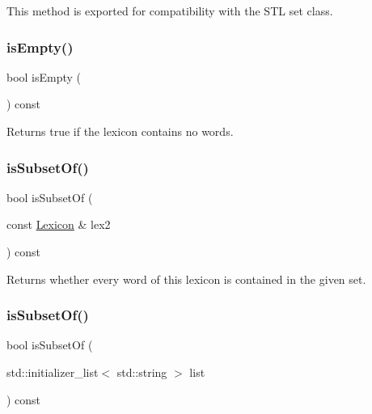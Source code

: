 This method is exported for compatibility with the S\+TL {\ttfamily set} class. \mbox{\label{classLexicon_acf82f9b2937375c7b1cf3dccb3df3312}} 
\subsubsection{\texorpdfstring{is\+Empty()}{isEmpty()}}
{\footnotesize\ttfamily bool is\+Empty (\begin{DoxyParamCaption}{ }\end{DoxyParamCaption}) const}



Returns {\ttfamily true} if the lexicon contains no words. 

\mbox{\label{classLexicon_a6c118f41dad8941a624c3ff479987e3d}} 
\subsubsection{\texorpdfstring{is\+Subset\+Of()}{isSubsetOf()}\hspace{0.1cm}{\footnotesize\ttfamily [1/2]}}
{\footnotesize\ttfamily bool is\+Subset\+Of (\begin{DoxyParamCaption}\item[{const \mbox{\hyperlink{classLexicon}{Lexicon}} \&}]{lex2 }\end{DoxyParamCaption}) const}



Returns whether every word of this lexicon is contained in the given set. 

\mbox{\label{classLexicon_a2a0f1241b53bcf0b31103b79cb01b87d}} 
\subsubsection{\texorpdfstring{is\+Subset\+Of()}{isSubsetOf()}\hspace{0.1cm}{\footnotesize\ttfamily [2/2]}}
{\footnotesize\ttfamily bool is\+Subset\+Of (\begin{DoxyParamCaption}\item[{std\+::initializer\+\_\+list$<$ std\+::string $>$}]{list }\end{DoxyParamCaption}) const}



